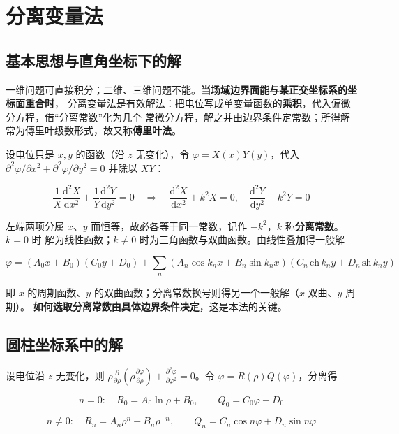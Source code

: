 
\section{分离变量法}

\subsection{基本思想与直角坐标下的解}

一维问题可直接积分；二维、三维问题不能。\textbf{当场域边界面能与某正交坐标系的坐标面重合时}，
分离变量法是有效解法：把电位写成单变量函数的\textbf{乘积}，代入偏微分方程，借“分离常数”化为几个
常微分方程，解之并由边界条件定常数；所得解常为傅里叶级数形式，故又称\textbf{傅里叶法}。

设电位只是 $x,y$ 的函数（沿 $z$ 无变化），令 $\varphi=X(x)Y(y)$，代入
$\partial^2\varphi/\partial x^2+\partial^2\varphi/\partial y^2=0$ 并除以 $XY$：
\begin{formulaBox}
\[
\frac{1}{X}\frac{\mathrm{d}^2X}{\mathrm{d}x^2}+\frac{1}{Y}\frac{\mathrm{d}^2Y}{\mathrm{d}y^2}=0
\quad\Longrightarrow\quad
\frac{\mathrm{d}^2X}{\mathrm{d}x^2}+k^2X=0,\quad
\frac{\mathrm{d}^2Y}{\mathrm{d}y^2}-k^2Y=0
\]
\end{formulaBox}

左端两项分属 $x$、$y$ 而恒等，故必各等于同一常数，记作 $-k^2$，$k$ 称\textbf{分离常数}。$k=0$ 时
解为线性函数；$k\neq0$ 时为三角函数与双曲函数。由线性叠加得一般解
\begin{formulaBox}
\[
\varphi=(A_0x+B_0)(C_0y+D_0)
+\sum_{n}\left(A_n\cos k_nx+B_n\sin k_nx\right)
\left(C_n\,\mathrm{ch}\,k_ny+D_n\,\mathrm{sh}\,k_ny\right)
\]
\end{formulaBox}

即 $x$ 的周期函数、$y$ 的双曲函数；分离常数换号则得另一个一般解（$x$ 双曲、$y$ 周期）。
\textbf{如何选取分离常数由具体边界条件决定}，这是本法的关键。

\subsection{圆柱坐标系中的解}

设电位沿 $z$ 无变化，则
$\rho\frac{\partial}{\partial\rho}\left(\rho\frac{\partial\varphi}{\partial\rho}\right)
+\frac{\partial^2\varphi}{\partial\varphi^2}=0$。令 $\varphi=R(\rho)Q(\varphi)$，分离得
\begin{formulaBox}
\[
n=0:\quad R_0=A_0\ln\rho+B_0,
\qquad
Q_0=C_0\varphi+D_0
\]
\end{formulaBox}
\begin{formulaBox}
\[
n\neq0:\quad R_n=A_n\rho^{n}+B_n\rho^{-n},
\qquad
Q_n=C_n\cos n\varphi+D_n\sin n\varphi
\]
\end{formulaBox}


